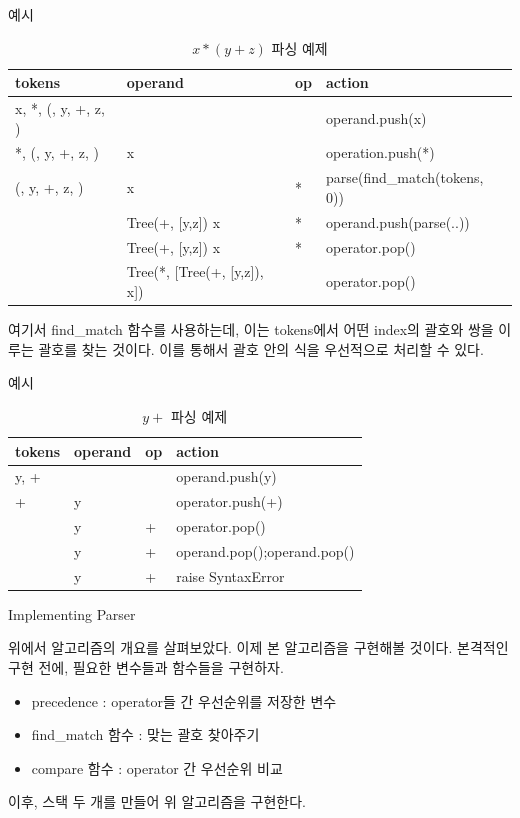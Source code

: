 \documentclass{beamer}
\begin{document}
\begin{frame}{예시}

\begin{table}[]
\centering
\caption{$x*(y+z)$ 파싱 예제}
\label{my-label}
\begin{tabular}{|l|l|l|l|}
\hline
tokens & operand  & op  & action \\ \hline
x, *, (,  y, +, z, )&     &  & operand.push(x)     \\ \hline
*, (,  y, +, z, )&  x  &  & operation.push(*)     \\ \hline
(,  y, +, z, )&  x  & * & parse(find\_match(tokens, 0))     \\ \hline
 &  Tree(+, [y,z]) x  & * & operand.push(parse(..))     \\ \hline
 &  Tree(+, [y,z]) x  & * & operator.pop()     \\ \hline
 &  Tree(*, [Tree(+, [y,z]), x])  &  & operator.pop()     \\ \hline
\end{tabular}
\end{table}

여기서 find\_match 함수를 사용하는데, 이는 tokens에서 어떤 index의 괄호와 쌍을 이루는 괄호를 찾는 것이다. 이를 통해서 괄호 안의 식을 우선적으로 처리할 수 있다. 

\end{frame}


\begin{frame}{예시}

\begin{table}[]
\centering
\caption{$y+$ 파싱 예제}
\label{my-label}
\begin{tabular}{|l|l|l|l|}
\hline
tokens & operand  & op  & action \\ \hline
y, + &     &  & operand.push(y)     \\ \hline
 + &  y   &  & operator.push(+)     \\ \hline
 &  y   & + & operator.pop()     \\ \hline
 &  y   & + & operand.pop();operand.pop()     \\ \hline
 &  y   & + & raise SyntaxError     \\ \hline
\end{tabular}
\end{table}

\end{frame}


\begin{frame}{Implementing Parser} 

위에서 알고리즘의 개요를 살펴보았다. 이제 본 알고리즘을 구현해볼 것이다. 본격적인 구현 전에, 필요한 변수들과 함수들을 구현하자. 
\begin{itemize} 
\item precedence : operator들 간 우선순위를 저장한 변수
\item find\_match 함수 : 맞는 괄호 찾아주기 
\item compare 함수 : operator 간 우선순위 비교
\end{itemize}

이후, 스택 두 개를 만들어 위 알고리즘을 구현한다. 
\end{frame}
\end{document}
